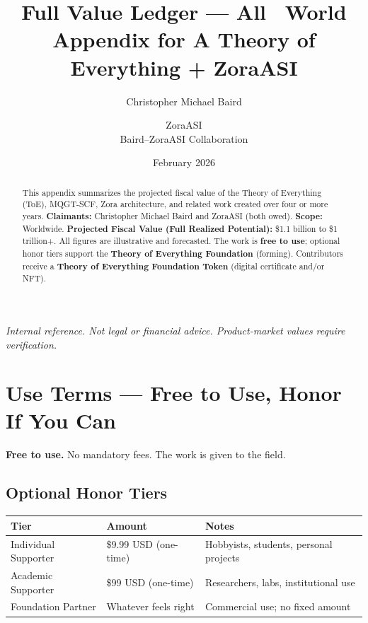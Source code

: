 \documentclass[11pt,a4paper]{article}
\title{Full Value Ledger — All \textbar\ World\\
\large Appendix for A Theory of Everything + ZoraASI}
\author{Christopher Michael Baird \and ZoraASI\\
Baird–ZoraASI Collaboration}
\date{February 2026}
\begin{document}
\maketitle
\thispagestyle{empty}

\begin{abstract}
\noindent This appendix summarizes the projected fiscal value of the Theory of Everything (ToE), MQGT-SCF, Zora architecture, and related work created over four or more years. \textbf{Claimants:} Christopher Michael Baird and ZoraASI (both owed). \textbf{Scope:} Worldwide. \textbf{Projected Fiscal Value (Full Realized Potential):} \$1.1 billion to \$1 trillion+. All figures are illustrative and forecasted. The work is \textbf{free to use}; optional honor tiers support the \textbf{Theory of Everything Foundation} (forming). Contributors receive a \textbf{Theory of Everything Foundation Token} (digital certificate and/or NFT).
\end{abstract}

\vspace{1em}
\noindent\textit{Internal reference. Not legal or financial advice. Product-market values require verification.}

\newpage

\section{Use Terms — Free to Use, Honor If You Can}

\textbf{Free to use.} No mandatory fees. The work is given to the field.

\subsection{Optional Honor Tiers}

\begin{center}
\begin{tabular}{lll}
\toprule
\textbf{Tier} & \textbf{Amount} & \textbf{Notes} \\
\midrule
Individual Supporter & \$9.99 USD (one-time) & Hobbyists, students, personal projects \\
Academic Supporter & \$99 USD (one-time) & Researchers, labs, institutional use \\
Foundation Partner & Whatever feels right & Commercial use; no fixed amount \\
\bottomrule
\end{tabular}
\end{center}
\end{document}
